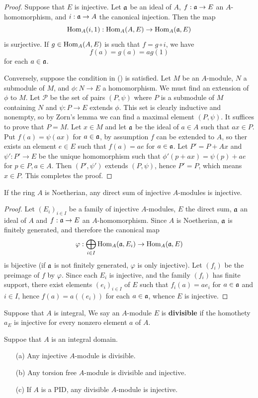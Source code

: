 \begin{proof}
Suppose that $E$ is injective. Let $\mathfrak{a}$ be an ideal of $A$, $f:\mathfrak{a}\to E$ an $A$-homomorphism, and $i:\mathfrak{a}\to A$ the canonical injection. Then the map
\[\mathrm{Hom}_A(i,1):\mathrm{Hom}_A(A,E)\to\mathrm{Hom}_A(\mathfrak{a},E)\]
is surjective. If $g\in\mathrm{Hom}_A(A,E)$ is such that $f=g\circ i$, we have
\[f(a)=g(a)=ag(1)\]
for each $a\in\mathfrak{a}$.\par
Conversely, suppose the condition in () is satisfied. Let $M$ be an $A$-module, $N$ a submodule of $M$, and $\phi:N\to E$ a homomorphism. We must find an extension of $\phi$ to $M$. Let $\mathscr{P}$ be the set of pairs $(P,\psi)$ where $P$ is a submodule of $M$ containing $N$ and $\psi:P\to E$ extends $\phi$. This set is clearly inductive and nonempty, so by Zorn's lemma we can find a maximal element $(P,\psi)$. It suffices to prove that $P=M$. Let $x\in M$ and let $\mathfrak{a}$ be the ideal of $a\in A$ such that $ax\in P$. Put $f(a)=\psi(ax)$ for $a\in\mathfrak{a}$, by assumption $f$ can be extended to $A$, so ther exists an element $e\in E$ such that $f(a)=ae$ for $a\in\mathfrak{a}$. Let $P'=P+Ax$ and $\psi':P'\to E$ be the unique homomorphism such that $\phi'(p+ax)=\psi(p)+ae$ for $p\in P,a\in A$. Then $(P',\psi')$ extends $(P,\psi)$, hence $P'=P$, which means $x\in P$. This completes the proof. 
\end{proof}
\begin{corollary}\label{Noe ring injective direct sum injective}
If the ring $A$ is Noetherian, any direct sum of injective $A$-modules is injective.
\end{corollary}
\begin{proof}
Let $(E_i)_{i\in I}$ be a family of injective $A$-modules, $E$ the direct sum, $\mathfrak{a}$ an ideal of $A$ and $f:\mathfrak{a}\to E$ an $A$-homomorphism. Since $A$ is Noetherian, $\mathfrak{a}$ is finitely generated, and therefore the canonical map
\[\varphi:\bigoplus_{i\in I}\mathrm{Hom}_A(\mathfrak{a},E_i)\to\mathrm{Hom}_A(\mathfrak{a},E)\]
is bijective (if $\mathfrak{a}$ is not finitely generated, $\varphi$ is only injective). Let $(f_i)$ be the preimage of $f$ by $\varphi$. Since each $E_i$ is injective, and the family $(f_i)$ has finite support, there exist elements $(e_i)_{i\in I}$ of $E$ such that $f_i(a)=ae_i$ for $a\in\mathfrak{a}$ and $i\in I$, hence $f(a)=a((e_i))$ for each $a\in\mathfrak{a}$, whence $E$ is injective.
\end{proof}
Suppose that $A$ is integral, We say an $A$-module $E$ is \textbf{divisible} if the homothety $a_E$ is injective for every nonzero element $a$ of $A$.
\begin{corollary}\label{module injective and divisible for integral domain}
Suppoe that $A$ is an integral domain.
\begin{itemize}
\item[(a)] Any injective $A$-module is divisible.
\item[(b)] Any torsion free $A$-module is divisible and injective.
\item[(c)] If $A$ is a PID, any divisible $A$-module is injective.
\end{itemize}
\end{corollary}
